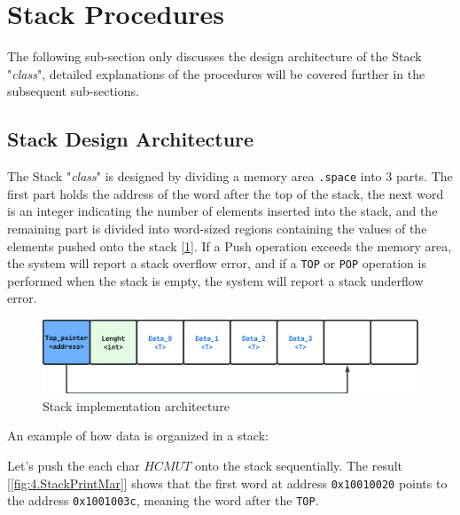 \section{Stack Procedures}

\label{sec:4.Stack}

The following sub-section only discusses the design architecture of the Stack "\textit{class}", detailed explanations of the procedures will be covered further in the subsequent sub-sections.

\subsection{Stack Design Architecture}
    The Stack "\textit{class}" is designed by dividing a memory area \texttt{.space} into 3 parts. The first part holds the address of the word after the top of the stack, the next word is an integer indicating the number of elements inserted into the stack, and the remaining part is divided into word-sized regions containing the values of the elements pushed onto the stack [\ref{fig:4.StackArchitecture}]. If a Push operation exceeds the memory area, the system will report a stack overflow error, and if a \texttt{TOP} or \texttt{POP} operation is performed when the stack is empty, the system will report a stack underflow error.
    
    \begin{figure}[htbp]
        \centering
        \includegraphics[width=1\textwidth]{graphics/3.StackArchitecture.png}
        \caption{Stack implementation architecture}
        \label{fig:4.StackArchitecture}
    \end{figure}
    
    An example of how data is organized in a stack:

    Let's push the each char \(HCMUT\) onto the stack sequentially. The result [\ref{fig:4.StackPrintMar}] shows that the first word at address \texttt{0x10010020} points to the address \texttt{0x1001003c}, meaning the word after the \texttt{TOP}.


